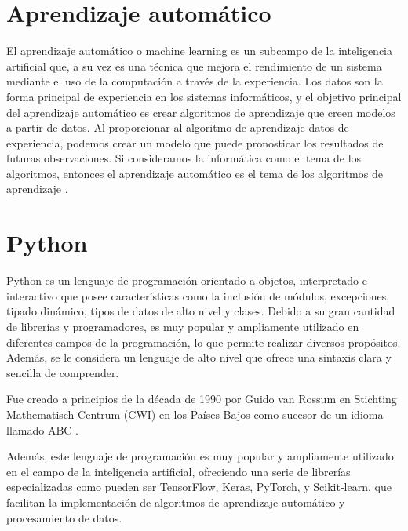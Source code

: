 \section{Aprendizaje automático}

El aprendizaje automático o machine learning es un subcampo de la inteligencia artificial que, a su vez es una técnica que mejora el rendimiento de un sistema mediante el uso de la computación a través de la experiencia. Los datos son la forma principal de experiencia en los sistemas informáticos, y el objetivo principal del aprendizaje automático es crear algoritmos de aprendizaje que creen modelos a partir de datos. Al proporcionar al algoritmo de aprendizaje datos de experiencia, podemos crear un modelo que puede pronosticar los resultados de futuras observaciones. Si consideramos la informática como el tema de los algoritmos, entonces el aprendizaje automático es el tema de los algoritmos de aprendizaje \cite{machinelearning}.


\section{Python}

Python \cite{python} es un lenguaje de programación orientado a objetos, interpretado e interactivo que posee características como la inclusión de módulos, excepciones, tipado dinámico, tipos de datos de alto nivel y clases. Debido a su gran cantidad de librerías y programadores, es muy popular y ampliamente utilizado en diferentes campos de la programación, lo que permite realizar diversos propósitos. Además, se le considera un lenguaje de alto nivel que ofrece una sintaxis clara y sencilla de comprender. 

Fue creado a principios de la década de 1990 por Guido van Rossum en Stichting Mathematisch Centrum (CWI) en los Países Bajos como sucesor de un idioma llamado ABC \cite{pythonhistory}. 

Además, este lenguaje de programación es muy popular y ampliamente utilizado en el campo de la inteligencia artificial, ofreciendo una serie de librerías especializadas como pueden ser TensorFlow, Keras, PyTorch, y Scikit-learn, que facilitan la implementación de algoritmos de aprendizaje automático y procesamiento de datos. 


